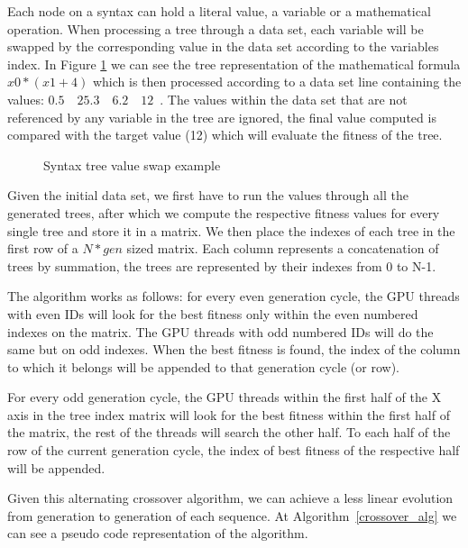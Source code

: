 \documentclass[runningheads]{llncs}
\begin{document}
Each node on a syntax can hold a literal value, a variable or a mathematical operation. When processing a tree through a data set, each variable will be swapped by the corresponding value in the data set according to the variables index. In Figure \ref{syntree} we can see the tree representation of the mathematical formula $x0 * (x1+4)$ which is then processed according to a data set line containing the values: $0.5\quad 25.3\quad 6.2\quad 12$\ . The values within the data set that are not referenced by any variable in the tree are ignored, the final value computed is compared with the target value (12) which will evaluate the fitness of the tree.

\begin{figure}
\hfil
{}
\hfil
\caption{Syntax tree value swap example}
\label{syntree}
\end{figure}

Given the initial data set, we first have to run the values through all the generated trees, after which we compute the respective fitness values for every single tree and store it in a matrix. We then place the indexes of each tree in the first row of a $N * gen$ sized matrix. Each column represents a concatenation of trees by summation, the trees are represented by their indexes from 0 to N-1.

The algorithm works as follows: for every even generation cycle, the GPU threads with even IDs will look for the best fitness only within the even numbered indexes on the matrix. The GPU threads with odd numbered IDs will do the same but on odd indexes. When the best fitness is found, the index of the column to which it belongs will be appended to that generation cycle (or row).

For every odd generation cycle, the GPU threads within the first half of the X axis in the tree index matrix will look for the best fitness within the first half of the matrix, the rest of the threads will search the other half. To each half of the row of the current generation cycle, the index of best fitness of the respective half will be appended.

Given this alternating crossover algorithm, we can achieve a less linear evolution from generation to generation of each sequence. At Algorithm~\ref{crossover_alg} we can see a pseudo code representation of the algorithm.
\end{document}
